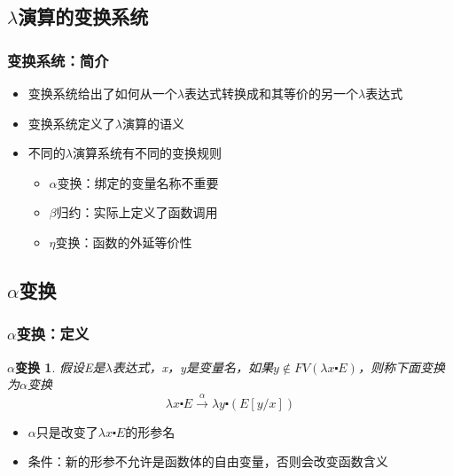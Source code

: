 \documentclass[CJKutf8,compress,hyperref]{beamer}
\begin{document}
\begin{CJK}{UTF8}{song}
\section{$\lambda$演算的变换系统}
\begin{frame}
  \frametitle{变换系统：简介} 
  \begin{itemize}
  \item 变换系统给出了如何从一个$\lambda$表达式转换成和其等价的另一个$\lambda$表达式
  \item 变换系统定义了$\lambda$演算的语义
  \item 不同的$\lambda$演算系统有不同的变换规则
    \begin{itemize}
    \item $\alpha$变换：绑定的变量名称不重要
    \item $\beta$归约：实际上定义了函数调用 
    \item $\eta$变换：函数的外延等价性
    \end{itemize}
  \end{itemize}
\end{frame}

\subsection{$\alpha$变换}
\begin{frame}
  \frametitle{$\alpha$变换：定义} 
  \newtheorem{alphaTrans}{$\alpha$变换} 
  \begin{alphaTrans}
    假设E是$\lambda$表达式，x，y是变量名，如果$y \not \in FV(\lambda x \centerdot E)$，则称下面变换为{\color{red}$\alpha$}变换 
    \begin{displaymath}
      \lambda x \centerdot E \stackrel{\alpha}{\longrightarrow} \lambda y \centerdot(E[y/x]) 
    \end{displaymath}
  \end{alphaTrans} 
  \begin{itemize}
  \item $\alpha$只是改变了$\lambda x \centerdot E$的形参名 
  \item{条件}：{\color{red}新的形参不允许是函数体的自由变量}，否则会改变函数含义
  \end{itemize}
\end{frame} 


\end{CJK}
\end{document}
